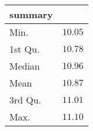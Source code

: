 \begin{table}[!tbp]
\begin{center}
\begin{tabular}{lr}
\hline\hline
\multicolumn{1}{l}{summary}&\multicolumn{1}{c}{}\tabularnewline
\hline
Min.&$10.05$\tabularnewline
1st Qu.&$10.78$\tabularnewline
Median&$10.96$\tabularnewline
Mean&$10.87$\tabularnewline
3rd Qu.&$11.01$\tabularnewline
Max.&$11.10$\tabularnewline
\hline
\end{tabular}\end{center}
\end{table}
